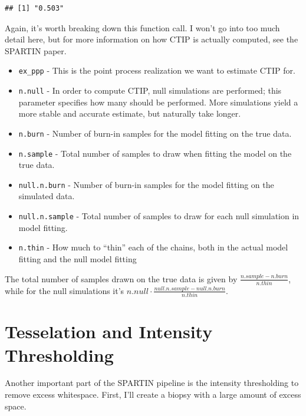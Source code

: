 \documentclass[
]{book}
\providecommand{\tightlist}{%
  \setlength{\itemsep}{0pt}\setlength{\parskip}{0pt}}
\begin{document}
\begin{verbatim}
## [1] "0.503"
\end{verbatim}

Again, it's worth breaking down this function call. I won't go into too much detail here, but for more information on how CTIP is actually computed, see the SPARTIN paper.

\begin{itemize}
\tightlist
\item
  \texttt{ex\_ppp} - This is the point process realization we want to estimate CTIP for.
\item
  \texttt{n.null} - In order to compute CTIP, null simulations are performed; this parameter specifies how many should be performed. More simulations yield a more stable and accurate estimate, but naturally take longer.
\item
  \texttt{n.burn} - Number of burn-in samples for the model fitting on the true data.
\item
  \texttt{n.sample} - Total number of samples to draw when fitting the model on the true data.
\item
  \texttt{null.n.burn} - Number of burn-in samples for the model fitting on the simulated data.
\item
  \texttt{null.n.sample} - Total number of samples to draw for each null simulation in model fitting.
\item
  \texttt{n.thin} - How much to ``thin'' each of the chains, both in the actual model fitting and the null model fitting
\end{itemize}

The total number of samples drawn on the true data is given by \(\frac{n.sample - n.burn}{n.thin}\), while for the null simulations it's \(n.null \cdot \frac{null.n.sample - null.n.burn}{n.thin}\).

\hypertarget{tesselation-and-intensity-thresholding}{%
\section{Tesselation and Intensity Thresholding}\label{tesselation-and-intensity-thresholding}}

Another important part of the SPARTIN pipeline is the intensity thresholding to remove excess whitespace. First, I'll create a biopsy with a large amount of excess space.
\end{document}
